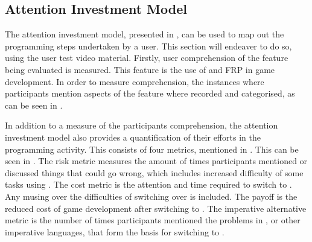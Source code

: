 \subsection{Attention Investment Model}
The attention investment model, presented in , can be used to map out the programming steps undertaken by a user. This section will endeaver to do so, using the user test video material. Firstly, user comprehension of the feature being evaluated is measured. This feature is the use of \fsh and \gls{FRP} in game development. In order to measure comprehension, the instances where participants mention aspects of the feature where recorded and categorised, as can be seen in .

\begin{table}[H]
	\caption{User Comprehension of the Feature}
	\label{tab:comp-matrix}
\end{table}

In addition to a measure of the participants comprehension, the attention investment model also provides a quantification of their efforts in the programming activity. This consists of four metrics, mentioned in . This can be seen in . The risk metric measures the amount of times participants mentioned or discussed things that could go wrong, which includes increased difficulty of some tasks using \fsh. The cost metric is the attention and time required to switch to \fsh. Any musing over the difficulties of switching over is included. The payoff is the reduced cost of game development after switching to \fsh. The imperative alternative metric is the number of times participants mentioned the problems in \csh, or other imperative languages, that form the basis for switching to \fsh.

\begin{table}[H]
	\caption{Attention Investment Findings}
	\label{tab:att-inv-findings}
\end{table}

